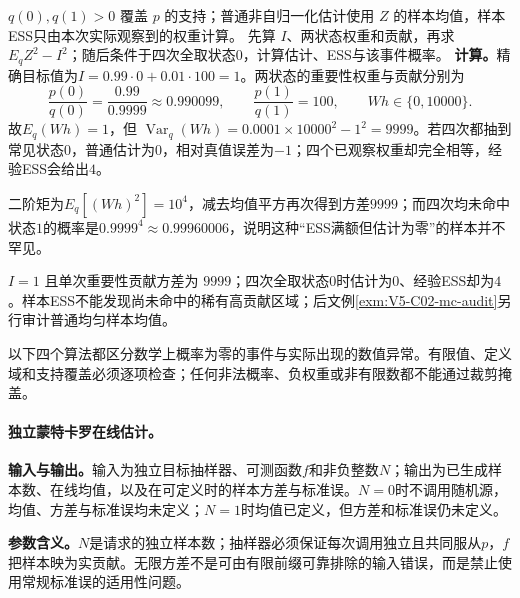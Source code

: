 \begin{solution}
\SolGiven $q(0),q(1)>0$ 覆盖 $p$ 的支持；普通非自归一化估计使用 $Z$ 的样本均值，样本ESS只由本次实际观察到的权重计算。
\SolPlan 先算 $I$、两状态权重和贡献，再求 $E_qZ^2-I^2$；随后条件于四次全取状态$0$，计算估计、ESS与该事件概率。
\SolDerive
\textbf{计算。}精确目标值为$I=0.99\cdot0+0.01\cdot100=1$。两状态的重要性权重与贡献分别为
\[
\frac{p(0)}{q(0)}=\frac{0.99}{0.9999}\approx0.990099,
\qquad \frac{p(1)}{q(1)}=100,
\qquad Wh\in\{0,10000\}.
\]
故$E_q(Wh)=1$，但
$\operatorname{Var}_q(Wh)=0.0001\times10000^2-1^2=9999$。若四次都抽到常见状态$0$，普通估计为$0$，相对真值误差为$-1$；四个已观察权重却完全相等，经验ESS会给出$4$。

\SolCheck 二阶矩为$E_q[(Wh)^2]=10^4$，减去均值平方再次得到方差$9999$；而四次均未命中状态$1$的概率是$0.9999^4\approx0.99960006$，说明这种“ESS满额但估计为零”的样本并不罕见。

\SolAnswer $I=1$ 且单次重要性贡献方差为 $9999$；四次全取状态$0$时估计为$0$、经验ESS却为$4$。样本ESS不能发现尚未命中的稀有高贡献区域；后文例\ref{exm:V5-C02-mc-audit}另行审计普通均匀样本均值。
\end{solution}

\nopagebreak[4]
\label{struct:V5-C02-CH19}
\nopagebreak[4]
以下四个算法都区分数学上概率为零的事件与实际出现的数值异常。有限值、定义域和支持覆盖必须逐项检查；任何非法概率、负权重或非有限数都不能通过裁剪掩盖。

\label{struct:V5-C02-CH20}
\paragraph{独立蒙特卡罗在线估计。}
\textbf{输入与输出。}输入为独立目标抽样器、可测函数$f$和非负整数$N$；输出为已生成样本数、在线均值，以及在可定义时的样本方差与标准误。$N=0$时不调用随机源，均值、方差与标准误均未定义；$N=1$时均值已定义，但方差和标准误仍未定义。

\label{struct:V5-C02-CH21}
\textbf{参数含义。}$N$是请求的独立样本数；抽样器必须保证每次调用独立且共同服从$p$，$f$把样本映为实贡献。无限方差不是可由有限前缀可靠排除的输入错误，而是禁止使用常规标准误的适用性问题。

